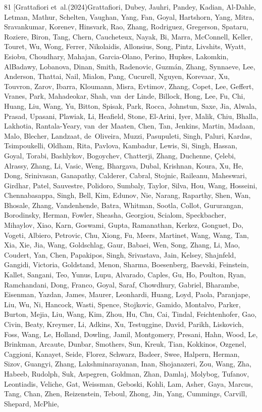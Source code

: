 \documentclass{llmxive}
\begin{document}
\begin{thebibliography}{81}
\bibitem[{Grattafiori et~al.(2024)Grattafiori, Dubey, Jauhri, Pandey, Kadian, Al-Dahle, Letman, Mathur, Schelten, Vaughan, Yang, Fan, Goyal, Hartshorn, Yang, Mitra, Sravankumar, Korenev, Hinsvark, Rao, Zhang, Rodriguez, Gregerson, Spataru, Roziere, Biron, Tang, Chern, Caucheteux, Nayak, Bi, Marra, McConnell, Keller, Touret, Wu, Wong, Ferrer, Nikolaidis, Allonsius, Song, Pintz, Livshits, Wyatt, Esiobu, Choudhary, Mahajan, Garcia-Olano, Perino, Hupkes, Lakomkin, AlBadawy, Lobanova, Dinan, Smith, Radenovic, Guzmán, Zhang, Synnaeve, Lee, Anderson, Thattai, Nail, Mialon, Pang, Cucurell, Nguyen, Korevaar, Xu, Touvron, Zarov, Ibarra, Kloumann, Misra, Evtimov, Zhang, Copet, Lee, Geffert, Vranes, Park, Mahadeokar, Shah, van~der Linde, Billock, Hong, Lee, Fu, Chi, Huang, Liu, Wang, Yu, Bitton, Spisak, Park, Rocca, Johnstun, Saxe, Jia, Alwala, Prasad, Upasani, Plawiak, Li, Heafield, Stone, El-Arini, Iyer, Malik, Chiu, Bhalla, Lakhotia, Rantala-Yeary, van~der Maaten, Chen, Tan, Jenkins, Martin, Madaan, Malo, Blecher,
  Landzaat, de~Oliveira, Muzzi, Pasupuleti, Singh, Paluri, Kardas, Tsimpoukelli, Oldham, Rita, Pavlova, Kambadur, Lewis, Si, Singh, Hassan, Goyal, Torabi, Bashlykov, Bogoychev, Chatterji, Zhang, Duchenne, Çelebi, Alrassy, Zhang, Li, Vasic, Weng, Bhargava, Dubal, Krishnan, Koura, Xu, He, Dong, Srinivasan, Ganapathy, Calderer, Cabral, Stojnic, Raileanu, Maheswari, Girdhar, Patel, Sauvestre, Polidoro, Sumbaly, Taylor, Silva, Hou, Wang, Hosseini, Chennabasappa, Singh, Bell, Kim, Edunov, Nie, Narang, Raparthy, Shen, Wan, Bhosale, Zhang, Vandenhende, Batra, Whitman, Sootla, Collot, Gururangan, Borodinsky, Herman, Fowler, Sheasha, Georgiou, Scialom, Speckbacher, Mihaylov, Xiao, Karn, Goswami, Gupta, Ramanathan, Kerkez, Gonguet, Do, Vogeti, Albiero, Petrovic, Chu, Xiong, Fu, Meers, Martinet, Wang, Wang, Tan, Xia, Xie, Jia, Wang, Goldschlag, Gaur, Babaei, Wen, Song, Zhang, Li, Mao, Coudert, Yan, Chen, Papakipos, Singh, Srivastava, Jain, Kelsey, Shajnfeld, Gangidi, Victoria, Goldstand, Menon, Sharma, Boesenberg,
  Baevski, Feinstein, Kallet, Sangani, Teo, Yunus, Lupu, Alvarado, Caples, Gu, Ho, Poulton, Ryan, Ramchandani, Dong, Franco, Goyal, Saraf, Chowdhury, Gabriel, Bharambe, Eisenman, Yazdan, James, Maurer, Leonhardi, Huang, Loyd, Paola, Paranjape, Liu, Wu, Ni, Hancock, Wasti, Spence, Stojkovic, Gamido, Montalvo, Parker, Burton, Mejia, Liu, Wang, Kim, Zhou, Hu, Chu, Cai, Tindal, Feichtenhofer, Gao, Civin, Beaty, Kreymer, Li, Adkins, Xu, Testuggine, David, Parikh, Liskovich, Foss, Wang, Le, Holland, Dowling, Jamil, Montgomery, Presani, Hahn, Wood, Le, Brinkman, Arcaute, Dunbar, Smothers, Sun, Kreuk, Tian, Kokkinos, Ozgenel, Caggioni, Kanayet, Seide, Florez, Schwarz, Badeer, Swee, Halpern, Herman, Sizov, Guangyi, Zhang, Lakshminarayanan, Inan, Shojanazeri, Zou, Wang, Zha, Habeeb, Rudolph, Suk, Aspegren, Goldman, Zhan, Damlaj, Molybog, Tufanov, Leontiadis, Veliche, Gat, Weissman, Geboski, Kohli, Lam, Asher, Gaya, Marcus, Tang, Chan, Zhen, Reizenstein, Teboul, Zhong, Jin, Yang, Cummings, Carvill, Shepard, McPhie,
}
\end{thebibliography}
\end{document}
